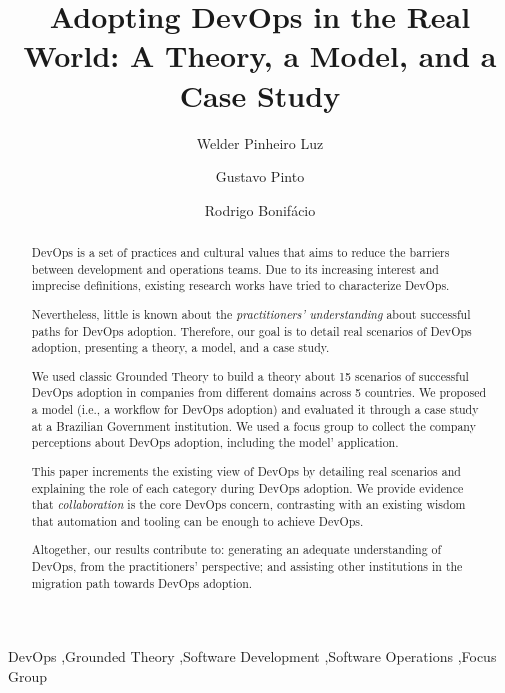 \documentclass[preprint,12pt,3p]{elsarticle}
\begin{document}
\begin{frontmatter}

\title{Adopting DevOps in the Real World: A Theory, a Model, and a Case Study}

\author[label1]{Welder Pinheiro Luz}
\address[label1]{Brazilian Federal Court of Accounts}

\author[label2]{Gustavo Pinto}
\address[label2]{Federal University of Par\'a}

\author[label3]{Rodrigo Bonif\'acio}
\address[label3]{University of Bras\'{i}lia}

\begin{abstract}

DevOps is a set of practices and cultural values
that aims to reduce the
barriers between development and operations
teams. Due to its increasing interest and imprecise
definitions, existing research works have tried to
characterize DevOps.

Nevertheless, little is
known about the \emph{practitioners' understanding}
about successful paths for DevOps adoption. Therefore, our goal is to detail
real scenarios of DevOps adoption, presenting a theory, a model, and a case study.

We used classic Grounded Theory to build a theory about 15
scenarios of successful DevOps adoption in companies from different
domains across 5 countries. We proposed a model (i.e., a workflow for DevOps
adoption) and evaluated it through
a case study at a Brazilian Government institution. We used a focus group to
collect the company perceptions about DevOps adoption, including the model'
application.

This paper increments the existing view of
DevOps by detailing real scenarios and explaining the role of each
category during DevOps adoption.
We provide evidence that \emph{collaboration} is the core DevOps concern,
contrasting with an existing wisdom that automation and tooling can be enough
to achieve DevOps.

Altogether, our results contribute to: generating
an adequate understanding of DevOps, from the practitioners' perspective; and
assisting other institutions in the migration path towards DevOps adoption.

\end{abstract}

\begin{keyword}
DevOps \sep Grounded Theory \sep Software Development \sep Software Operations \sep Focus Group
\end{keyword}

\end{frontmatter}
























\end{document}
